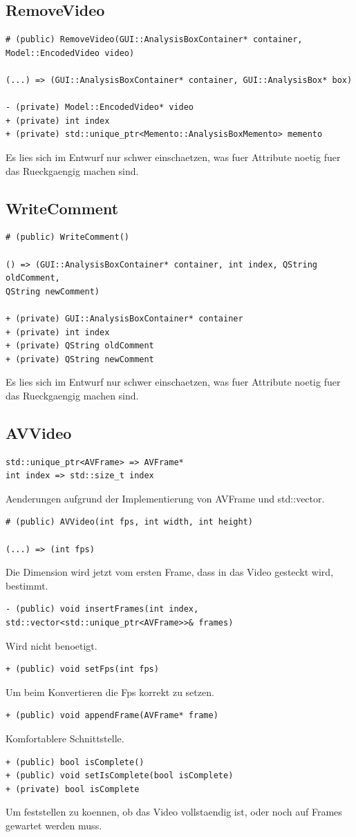 \documentclass[parskip=full]{scrartcl}
\begin{document}
\subsection{RemoveVideo}
\begin{verbatim}
# (public) RemoveVideo(GUI::AnalysisBoxContainer* container, Model::EncodedVideo video)

(...) => (GUI::AnalysisBoxContainer* container, GUI::AnalysisBox* box)

- (private) Model::EncodedVideo* video
+ (private) int index
+ (private) std::unique_ptr<Memento::AnalysisBoxMemento> memento
\end{verbatim}
Es lies sich im Entwurf nur schwer einschaetzen, was fuer Attribute noetig fuer das Rueckgaengig machen sind.
\subsection{WriteComment}
\begin{verbatim}
# (public) WriteComment()

() => (GUI::AnalysisBoxContainer* container, int index, QString oldComment,
QString newComment)

+ (private) GUI::AnalysisBoxContainer* container
+ (private) int index
+ (private) QString oldComment
+ (private) QString newComment
\end{verbatim}
Es lies sich im Entwurf nur schwer einschaetzen, was fuer Attribute noetig fuer das Rueckgaengig machen sind.
\subsection{AVVideo}
\begin{verbatim}
std::unique_ptr<AVFrame> => AVFrame*
int index => std::size_t index
\end{verbatim}
Aenderungen aufgrund der Implementierung von AVFrame und std::vector.
\begin{verbatim}
# (public) AVVideo(int fps, int width, int height)

(...) => (int fps)
\end{verbatim}
Die Dimension wird jetzt vom ersten Frame, dass in das Video gesteckt wird, bestimmt.

\begin{verbatim}
- (public) void insertFrames(int index, std::vector<std::unique_ptr<AVFrame>>& frames)
\end{verbatim}
Wird nicht benoetigt.

\begin{verbatim}
+ (public) void setFps(int fps)
\end{verbatim}
Um beim Konvertieren die Fps korrekt zu setzen.
\begin{verbatim}
+ (public) void appendFrame(AVFrame* frame)
\end{verbatim}
Komfortablere Schnittstelle.
\begin{verbatim}
+ (public) bool isComplete()
+ (public) void setIsComplete(bool isComplete)
+ (private) bool isComplete
\end{verbatim}
Um feststellen zu koennen, ob das Video vollstaendig ist, oder noch auf Frames gewartet werden muss.
\end{document}
